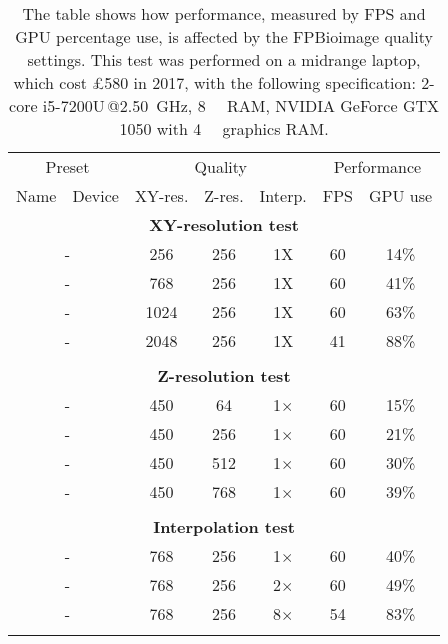 \begin{table}
\caption[FPBioimage: Adjustable quality settings allow high performance on consumer-grade computers]{\label{tab:fpbPerformance}The table shows how performance, measured by FPS and GPU percentage use, is affected by the FPBioimage quality settings. This test was performed on a midrange laptop, which cost £580 in 2017, with the following specification: 2-core i5-7200U\,@\SI{2.50}{\giga\hertz}, \SI{8}{\giga\byte} RAM, NVIDIA GeForce GTX 1050 with \SI{4}{\giga\byte} graphics RAM.}
\centering
\begin{tabular}{|l l|c c c|c c|}
\hline
\multicolumn{2}{|c|}{Preset} & \multicolumn{3}{c|}{Quality} & \multicolumn{2}{c|}{Performance} \\
\multicolumn{1}{|c}{Name} & \multicolumn{1}{c|}{Device} & XY-res. & Z-res. & \multicolumn{1}{c|}{Interp.} & FPS & \multicolumn{1}{c|}{GPU use} \\
\hline

\multicolumn{7}{|c|}{\textbf{XY-resolution test}} \\ \hline
\multicolumn{2}{|c|}{-} & 256 & 256 & 1X & 60 & 14\% \\
\multicolumn{2}{|c|}{-} & 768 & 256 & 1X & 60 & 41\% \\
\multicolumn{2}{|c|}{-} & 1024 & 256 & 1X & 60 & 63\% \\
\multicolumn{2}{|c|}{-} & 2048 & 256 & 1X & 41 & 88\% \\
 & & & & & & \\
\hline

\multicolumn{7}{|c|}{\textbf{Z-resolution test}} \\ \hline
\multicolumn{2}{|c|}{-} & 450 & 64 & 1$\times$ & 60 & 15\% \\
\multicolumn{2}{|c|}{-} & 450 & 256 & 1$\times$ & 60 & 21\% \\
\multicolumn{2}{|c|}{-} & 450 & 512 & 1$\times$ & 60 & 30\% \\
\multicolumn{2}{|c|}{-} & 450 & 768 & 1$\times$ & 60 & 39\% \\
 & & & & & & \\
\hline

\multicolumn{7}{|c|}{\textbf{Interpolation test}} \\ \hline
\multicolumn{2}{|c|}{-} & 768 & 256 & 1$\times$ & 60 & 40\% \\
\multicolumn{2}{|c|}{-} & 768 & 256 & 2$\times$ & 60 & 49\% \\
\multicolumn{2}{|c|}{-} & 768 & 256 & 8$\times$ & 54 & 83\% \\
 & & & & & & \\
\hline


\end{tabular}
\end{table}
